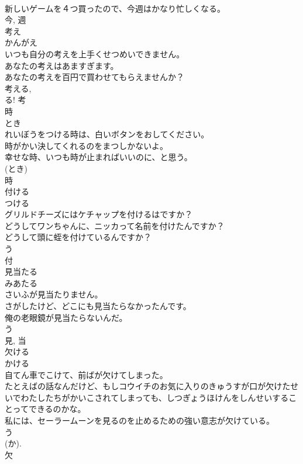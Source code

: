 \documentclass[8pt]{extreport}
\begin{document}
\begin{CJK}{UTF8}{min}
\\	新しいゲームを４つ買ったので、今週はかなり忙しくなる。	
\\	今, 週	
\\	考え	
\\	かんがえ	
\\	いつも自分の考えを上手くせつめいできません。	
\\	あなたの考えはあますぎます。	
\\	あなたの考えを百円で買わせてもらえませんか？	
\\	考える, 
\\	る!	考	
\\	時	
\\	とき	
\\	れいぼうをつける時は、白いボタンをおしてください。	
\\	時がかい決してくれるのをまつしかないよ。	
\\	幸せな時、いつも時が止まればいいのに、と思う。	
\\	(とき) 
\\	時	
\\	付ける	
\\	つける	
\\	グリルドチーズにはケチャップを付けるはですか？	
\\	どうしてワンちゃんに、ニッカって名前を付けたんですか？	
\\	どうして頭に蛭を付けているんですか？	
\\	う 
\\	付	
\\	見当たる	
\\	みあたる	
\\	さいふが見当たりません。	
\\	さがしたけど、どこにも見当たらなかったんです。	
\\	俺の老眼鏡が見当たらないんだ。	
\\	う 
\\	見, 当	
\\	欠ける	
\\	かける	
\\	自てん車でこけて、前ばが欠けてしまった。	
\\	たとえばの話なんだけど、もしコウイチのお気に入りのきゅうすが口が欠けたせいでわたしたちがかいこされてしまっても、しつぎょうほけんをしんせいすることってできるのかな。	
\\	私には、セーラームーンを見るのを止めるための強い意志が欠けている。	
\\	う 
\\	(か). 
\\	欠	

\end{CJK}
\end{document}
